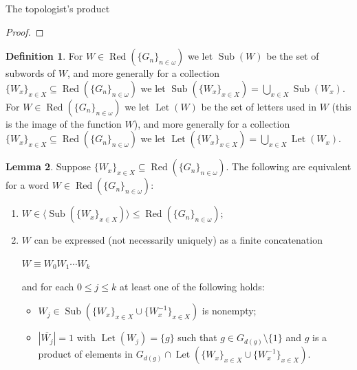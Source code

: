 \documentclass{amsart}
\theoremstyle{definition}\newtheorem{theorem}{Theorem}
\theoremstyle{definition}\newtheorem*{A}{Main Theorem}
\theoremstyle{definition}\newtheorem*{B}{Theorem \ref{elementaryequiv}}
\theoremstyle{definition}\newtheorem*{C}{Theorem \ref{continuous}}
\theoremstyle{definition}\newtheorem*{D}{Theorem \ref{bigisomorphism2}}
\theoremstyle{definition}\newtheorem{bigtheorem}{Main Theorem}
\numberwithin{theorem}{section}
\theoremstyle{definition}\newtheorem{corollary}[theorem]{Corollary}
\theoremstyle{definition}\newtheorem{proposition}[theorem]{Proposition}
\theoremstyle{definition}\newtheorem{definition}[theorem]{Definition}
\theoremstyle{definition}\newtheorem{question}[theorem]{Question}
\theoremstyle{definition}\newtheorem{example}[theorem]{Example}
\theoremstyle{definition}\newtheorem{remark}[theorem]{Remark}
\theoremstyle{definition}\newtheorem{note}[theorem]{Note}
\theoremstyle{definition}\newtheorem{lemma}[theorem]{Lemma}
\theoremstyle{definition}\newtheorem{fact}[theorem]{Fact}
\theoremstyle{definition}\newtheorem{define}[theorem]{Definition}
\theoremstyle{definition}\newtheorem{claim}[theorem]{Claim}
\theoremstyle{definition}\newtheorem{obs}[theorem]{Observation}
\theoremstyle{definition}\newtheorem{definitions}[theorem]{Definitions}
\newcommand{\Red}{\operatorname{Red}}
\newcommand{\Let}{\operatorname{Let}}
\newcommand{\Sub}{\operatorname{Sub}}
\begin{document}
\begin{section}{The topologist's product}
\begin{proof}
\end{proof}



\begin{definition}  For $W \in \Red(\{G_n\}_{n \in \omega})$ we let $\Sub(W)$ be the set of subwords of $W$, and more generally for a collection $\{W_x\}_{x \in X} \subseteq \Red(\{G_n\}_{n \in \omega})$ we let $\Sub(\{W_x\}_{x \in X}) = \bigcup_{x \in X}\Sub(W_x)$.  For $W \in \Red(\{G_n\}_{n \in \omega})$ we let $\Let(W)$ be the set of letters used in $W$ (this is the image of the function $W$), and more generally for a collection $\{W_x\}_{x \in X} \subseteq \Red(\{G_n\}_{n \in \omega})$ we let $\Let(\{W_x\}_{x \in X}) = \bigcup_{x \in X} \Let(W_x)$.
\end{definition}

\begin{lemma}\label{nicefine}  Suppose $\{W_x\}_{x \in X} \subseteq \Red(\{G_n\}_{n \in \omega})$.  The following are equivalent for a word $W \in \Red(\{G_n\}_{n \in \omega})$:

\begin{enumerate}

\item $W \in \langle \Sub(\{W_x\}_{x \in X}) \rangle \leq \Red(\{G_n\}_{n \in \omega})$;

\item $W$ can be expressed (not necessarily uniquely) as a finite concatenation

\begin{center}
$W \equiv W_0W_1 \cdots W_k$
\end{center}

\noindent and for each $0 \leq j \leq k$ at least one of the following holds:

\begin{itemize}
\item $W_j \in \Sub(\{W_x\}_{x \in X} \cup \{W_x^{-1}\}_{x \in X})$ is nonempty;

\item $|\overline{W_j}| = 1$ with $\Let(W_j) = \{g\}$ such that $g \in G_{d(g)}\setminus \{1\}$ and $g$ is a product of elements in $G_{d(g)} \cap \Let(\{W_x\}_{x \in X} \cup \{W_x^{-1}\}_{x \in X})$.

\end{itemize}

\end{enumerate}

\end{lemma}


\end{section}
\end{document}
